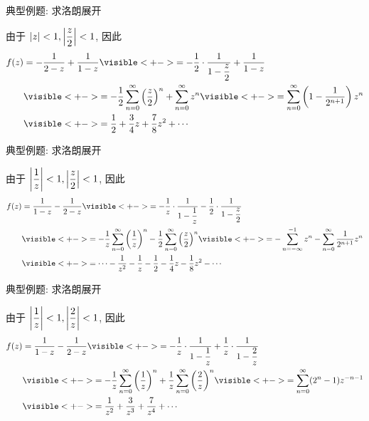 \begin{frame}{典型例题: 求洛朗展开}
\begin{solutionc}
 由于 $|z|<1,\left|\dfrac z2\right|<1$,
\onslide<+->
因此
\begin{align*}
f(z)&=-\frac1{2-z}+\frac1{1-z}
\visible<+->{=-\frac12\cdot\frac1{1-\dfrac z2}+\frac1{1-z}}\\
&\visible<+->{=-\frac12\sum_{n=0}^\infty\left(\frac z2\right)^n+\sum_{n=0}^\infty z^n}
\visible<+->{=\sum_{n=0}^\infty\left(1-\frac1{2^{n+1}}\right)z^n}\\
&\visible<+->{=\frac12+\frac34z+\frac78z^2+\cdots}
\end{align*}
\end{solutionc}
\end{frame}


\begin{frame}{典型例题: 求洛朗展开}
\begin{solutionc}
 由于 $\left|\dfrac1z\right|<1,\left|\dfrac z2\right|<1$, 
\onslide<+->
因此
\begin{align*}
f(z)&=\frac1{1-z}-\frac1{2-z}
\visible<+->{=-\frac1z\cdot\frac1{1-\dfrac1z}-\frac12\cdot\frac1{1-\dfrac z2}}\\
&\visible<+->{=-\frac1z\sum_{n=0}^\infty \left(\frac1z\right)^n-\frac12\sum_{n=0}^\infty\left(\frac z2\right)^n}
\visible<+->{=-\sum_{n=-\infty}^{-1}z^n-\sum_{n=0}^\infty\frac1{2^{n+1}}z^n}\\
&\visible<+->{=\cdots-\frac1{z^2}-\frac1z-\frac12-\frac14z-\frac18z^2-\cdots}
\end{align*}
\end{solutionc}
\end{frame}


\begin{frame}{典型例题: 求洛朗展开}
\begin{solutionc}
 由于 $\left|\dfrac1z\right|<1,\left|\dfrac2z\right|<1$, \onslide<+->
因此
\begin{align*}
f(z)&=\frac1{1-z}-\frac1{2-z}
	\visible<+->{=-\frac1z\cdot\frac1{1-\dfrac1z}+\frac1z\cdot\frac1{1-\dfrac2z}}\\
&\visible<+->{=-\frac1z\sum_{n=0}^\infty \left(\frac1z\right)^n+\frac1z\sum_{n=0}^\infty\left(\frac2z\right)^n}
	\visible<+->{=\sum_{n=0}^\infty(2^n-1)z^{-n-1}}\\
&\visible<+->{=\frac1{z^2}+\frac3{z^3}+\frac7{z^4}+\cdots}
\end{align*}
\end{solutionc}
\end{frame}


